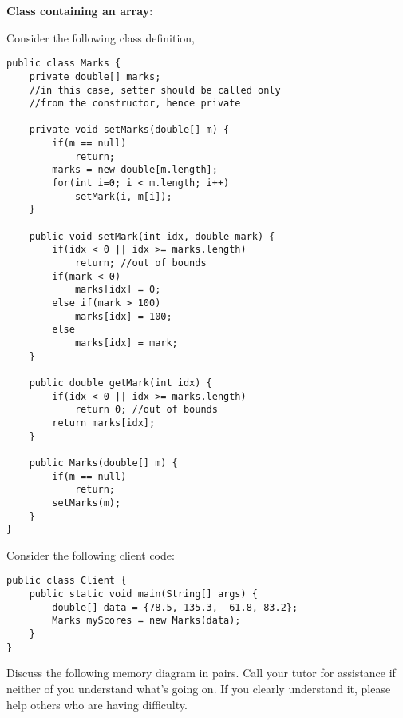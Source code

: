 \begin{questions}
\begin{parts}
\end{parts}

\newpage

\question \textbf{Class containing an array}: 

Consider the following class definition,

\begin{lstlisting}
public class Marks {
	private double[] marks;
	//in this case, setter should be called only 
	//from the constructor, hence private

	private void setMarks(double[] m) {
		if(m == null)
			return;
		marks = new double[m.length];
		for(int i=0; i < m.length; i++)
			setMark(i, m[i]);
	}

	public void setMark(int idx, double mark) {
		if(idx < 0 || idx >= marks.length)
			return; //out of bounds
		if(mark < 0)
			marks[idx] = 0;
		else if(mark > 100)
			marks[idx] = 100;
		else 
			marks[idx] = mark;
	}

	public double getMark(int idx) {
		if(idx < 0 || idx >= marks.length)
			return 0; //out of bounds
		return marks[idx];
	}

	public Marks(double[] m) {
		if(m == null)
			return;
		setMarks(m);
	}
}
\end{lstlisting}

\newpage

Consider the following client code:

\begin{lstlisting}
public class Client {
	public static void main(String[] args) {
		double[] data = {78.5, 135.3, -61.8, 83.2};
		Marks myScores = new Marks(data);
	}
}
\end{lstlisting}

Discuss the following memory diagram in pairs. Call your tutor for assistance if neither of you understand what's going on. If you clearly understand it, please help others who are having difficulty.



\end{questions}
